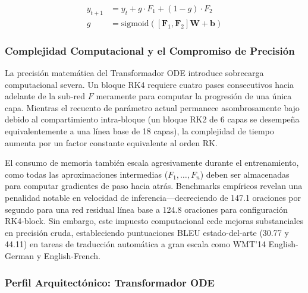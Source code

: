 \documentclass[11pt,a4paper]{article}
\begin{document}
$$
\begin{aligned}
y_{t+1} &= y_t + g \cdot F_1 + (1 - g) \cdot F_2 \\
g &= \text{sigmoid}([\mathbf{F}_1, \mathbf{F}_2]\mathbf{W} + \mathbf{b})
\end{aligned}
$$

\subsubsection{Complejidad Computacional y el Compromiso de Precisión}

La precisión matemática del Transformador ODE introduce sobrecarga computacional severa. Un bloque RK4 requiere cuatro pases consecutivos hacia adelante de la sub-red $F$ meramente para computar la progresión de una única capa. Mientras el recuento de parámetro actual permanece asombrosamente bajo debido al compartimiento intra-bloque (un bloque RK2 de 6 capas se desempeña equivalentemente a una línea base de 18 capas), la complejidad de tiempo aumenta por un factor constante equivalente al orden RK.

El consumo de memoria también escala agresivamente durante el entrenamiento, como todas las aproximaciones intermedias ($F_1, \dots, F_n$) deben ser almacenadas para computar gradientes de paso hacia atrás. Benchmarks empíricos revelan una penalidad notable en velocidad de inferencia---decreciendo de 147.1 oraciones por segundo para una red residual línea base a 124.8 oraciones para configuración RK4-block. Sin embargo, este impuesto computacional cede mejoras substanciales en precisión cruda, estableciendo puntuaciones BLEU estado-del-arte (30.77 y 44.11) en tareas de traducción automática a gran escala como WMT'14 English-German y English-French.

\subsubsection{Perfil Arquitectónico: Transformador ODE}
\end{document}
